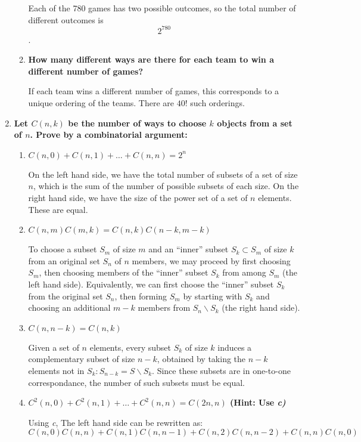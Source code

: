 \documentclass[12pt]{amsart}
\begin{document}
\begin{enumerate}
\begin{enumerate}
Each of the 780 games has two possible outcomes, so the total
number of different outcomes is
$$2^{780}$$.
\item {\bf How many different ways are there for each team to win a different number of games?}

If each team wins a different number of games, this corresponds to a unique ordering of the teams.  There are $40!$ such orderings.
\end{enumerate}

\medskip

\item {\bf Let $C(n,k)$ be the number of ways to choose $k$ objects from a set of $n$.  Prove by a combinatorial argument:}
\begin{enumerate}
\item {\bf $C(n,0)+C(n,1)+\ldots+C(n,n)=2^n$}

On the left hand side, we have the total number of subsets of a set of
size $n$, which is the sum of the number of possible subsets of each
size.  On the right hand side, we have the size of the power set of a
set of $n$ elements.  These are equal.

\item {\bf $C(n,m)C(m,k) = C(n,k)C(n-k,m-k)$}

To choose a subset $S_m$ of size $m$ and an ``inner'' subset $S_k
\subset S_m$ of size $k$ from an original set $S_n$ of $n$ members, we
may proceed by first choosing $S_m$, then choosing members of the
``inner'' subset $S_k$ from among $S_m$ (the left hand side).
Equivalently, we can first choose the ``inner'' subset $S_k$ from the
original set $S_n$, then forming $S_m$ by starting with $S_k$ and
choosing an additional $m-k$ members from $S_n \backslash S_k$ (the right hand
side).

\item {\bf $C(n,n-k) = C(n,k)$}

Given a set of $n$ elements, every subset $S_k$ of size $k$ induces a
complementary subset of size $n-k$, obtained by taking the $n-k$
elements not in $S_k: S_{n-k} = S \backslash S_k$.  Since these subsets are in
one-to-one correspondance, the number of such subsets must be equal.

\item {\bf $C^2(n,0)+C^2(n,1)+\ldots+C^2(n,n) = C(2n,n)$ (Hint: Use \em{c})}

Using {\em c}, The left hand side can be rewritten as:
$$
C(n,0)C(n,n)+C(n,1)C(n,n-1)+C(n,2)C(n,n-2)+C(n,n)C(n,0)
$$


\end{enumerate}
\end{enumerate}
\end{document}
